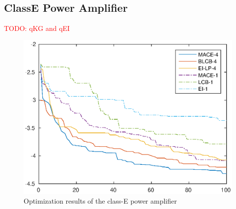 \subsection{ClassE Power Amplifier}

\textcolor{red}{TODO: qKG and qEI}

\begin{figure}[htbp]
\vskip 0.2in
\begin{center}
\centerline{\includegraphics[width=\columnwidth]{./img/ClassE_mean.eps}}
\caption{Optimization results of the class-E power amplifier}
\label{resDAC2014}
\end{center}
\vskip -0.2in
\end{figure}

